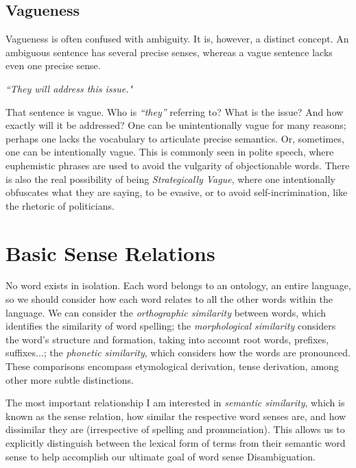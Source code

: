 \subsection{Vagueness}
Vagueness is often confused with ambiguity. It is, however, a distinct concept. An ambiguous sentence has several precise senses, whereas a vague sentence lacks even one precise sense.

\begin{center}
    \textit{``They will address this issue."}
\end{center}

That sentence is vague. Who is \textit{``they''} referring to? What is the issue? And how exactly will it be addressed? One can be unintentionally vague for many reasons; perhaps one lacks the vocabulary to articulate precise semantics. Or, sometimes, one can be intentionally vague. This is commonly seen in polite speech, where euphemistic phrases are used to avoid the vulgarity of objectionable words. There is also the real possibility of being \textit{Strategically Vague}, where one intentionally obfuscates what they are saying, to be evasive, or to avoid self-incrimination, like the rhetoric of politicians.

\section{Basic Sense Relations}
No word exists in isolation. Each word belongs to an ontology, an entire language, so we should consider how each word relates to all the other words within the language. We can consider the \textit{orthographic similarity} between words, which identifies the similarity of word spelling; the \textit{morphological similarity} considers the word's structure and formation, taking into account root words, prefixes, suffixes...; the \textit{phonetic similarity}, which considers how the words are pronounced. These comparisons encompass etymological derivation, tense derivation, among other more subtle distinctions. 

The most important relationship I am interested in \textit{semantic similarity}, which is known as the sense relation, how similar the respective word senses are, and how dissimilar they are (irrespective of spelling and pronunciation). This allows us to explicitly distinguish between the lexical form of terms from their semantic word sense to help accomplish our ultimate goal of word sense Disambiguation.


